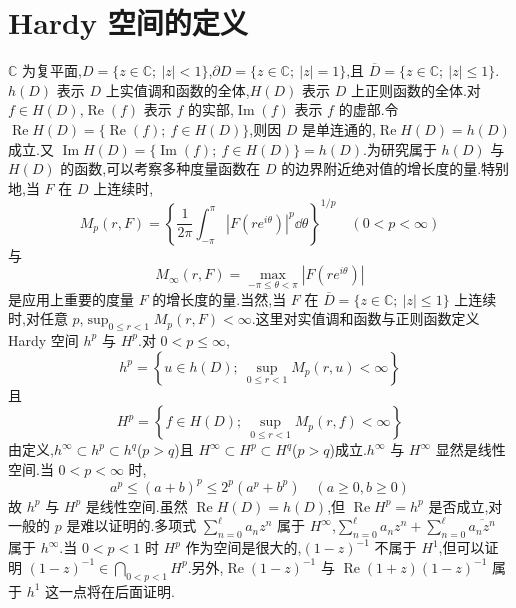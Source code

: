 \section{Hardy 空间的定义}\label{sec:2.1}


$\mathbb{C}$ 为复平面,$D = \{z \in \mathbb{C};\ |z| < 1\}$,$\partial D = \{z \in \mathbb{C};\ |z| = 1\}$,且 $\overline{D} = \{z \in \mathbb{C};\ |z| \leq 1\}$.$h(D)$ 表示 $D$ 上实值调和函数的全体,$H(D)$ 表示 $D$ 上正则函数的全体.对 $f \in H(D)$,$\operatorname{Re}(f)$ 表示 $f$ 的实部,$\operatorname{Im}(f)$ 表示 $f$ 的虚部.令 $\operatorname{Re} H(D) = \{\operatorname{Re}(f);\ f \in H(D)\}$,则因 $D$ 是单连通的,$\operatorname{Re} H(D) = h(D)$ 成立.又 $\operatorname{Im} H(D) = \{\operatorname{Im}(f);\ f \in H(D)\} = h(D)$.为研究属于 $h(D)$ 与 $H(D)$ 的函数,可以考察多种度量函数在 $D$ 的边界附近绝对值的增长度的量.特别地,当 $F$ 在 $D$ 上连续时,
\begin{equation*}
M_{p}(r, F) = \left\{\frac{1}{2\pi}\int_{-\pi}^{\pi}|F(re^{i\theta})|^{p}\dd\theta\right\}^{1/p} \quad (0 < p < \infty)
\end{equation*}
与
\begin{equation*}
M_{\infty}(r, F) = \max_{-\pi \leq \theta < \pi}|F(re^{i\theta})|
\end{equation*}
是应用上重要的度量 $F$ 的增长度的量.当然,当 $F$ 在 $\overline{D} = \{z \in \mathbb{C};\ |z| \leq 1\}$ 上连续时,对任意 $p$,$\sup_{0 \leq r < 1}M_{p}(r, F) < \infty$.这里对实值调和函数与正则函数定义 Hardy 空间 $h^{p}$ 与 $H^{p}$.对 $0 < p \leq \infty$,
\begin{equation*}
h^{p} = \left\{u \in h(D);\ \sup_{0 \leq r < 1}M_{p}(r, u) < \infty\right\}
\end{equation*}
且
\begin{equation*}
H^{p} = \left\{f \in H(D);\ \sup_{0 \leq r < 1}M_{p}(r, f) < \infty\right\}
\end{equation*}
由定义,$h^{\infty} \subset h^{p} \subset h^{q}$($p > q$)且 $H^{\infty} \subset H^{p} \subset H^{q}$($p > q$)成立.$h^{\infty}$ 与 $H^{\infty}$ 显然是线性空间.当 $0 < p < \infty$ 时,
\begin{equation*}
a^{p} \leq (a + b)^{p} \leq 2^{p}(a^{p} + b^{p}) \quad (a \geq 0, b \geq 0)
\end{equation*}
故 $h^{p}$ 与 $H^{p}$ 是线性空间.虽然 $\operatorname{Re} H(D) = h(D)$,但 $\operatorname{Re} H^{p} = h^{p}$ 是否成立,对一般的 $p$ 是难以证明的.多项式 $\sum_{n=0}^{\ell}a_{n}z^{n}$ 属于 $H^{\infty}$,$\sum_{n=0}^{\ell}a_{n}z^{n} + \sum_{n=0}^{\ell}\overline{a_{n}z^{n}}$ 属于 $h^{\infty}$.当 $0 < p < 1$ 时 $H^{p}$ 作为空间是很大的,$(1-z)^{-1}$ 不属于 $H^{1}$,但可以证明 $(1-z)^{-1} \in \bigcap_{0 < p < 1}H^{p}$.另外,$\operatorname{Re}(1-z)^{-1}$ 与 $\operatorname{Re}(1+z)(1-z)^{-1}$ 属于 $h^{1}$ 这一点将在后面证明.

